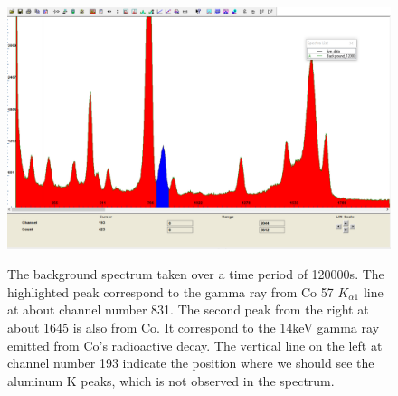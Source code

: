\documentclass[12pt]{article}
\begin{document}
\begin{figure}[H]
\begin{center}
\includegraphics[width=12cm]{background}
\label{Fig. 5}
\caption{The background spectrum taken over a time period of 120000s. The highlighted peak correspond to the gamma ray from Co 57 $K_{\alpha 1}$ line at about channel number 831. The second peak from the right at about 1645 is also from Co. It correspond to the 14keV gamma ray emitted from Co's radioactive decay. The vertical line on the left at channel number 193 indicate the position where we should see the aluminum K peaks, which is not observed in the spectrum.}
\end{center}
\end{figure}
\end{document}
